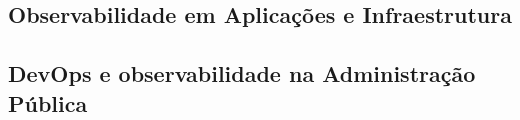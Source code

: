 \subsection{Observabilidade em Aplicações e Infraestrutura}\label{sec:observabilidade}

\begingroup
{}

\par
\endgroup

\subsection{DevOps e observabilidade na Administração Pública}\label{sec:setor-publico}


